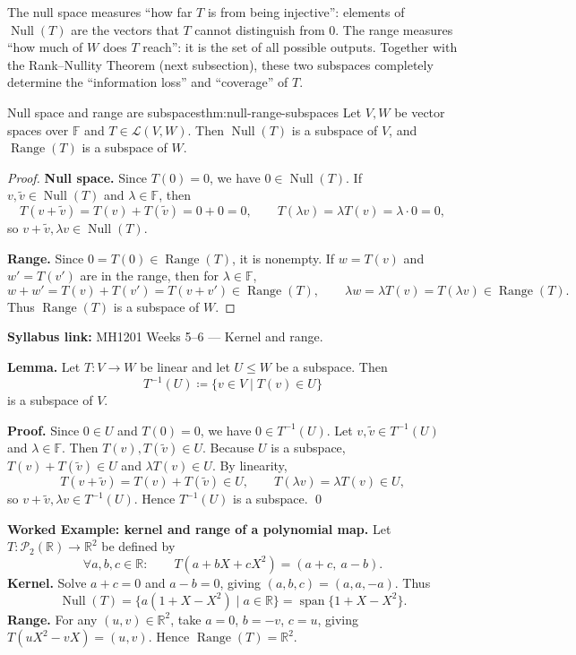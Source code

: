 The null space measures ``how far $T$ is from being injective'': elements of $\operatorname{Null}(T)$ are the vectors that $T$ cannot distinguish from $0$.
The range measures ``how much of $W$ does $T$ reach'': it is the set of all possible outputs.
Together with the Rank--Nullity Theorem (next subsection), these two subspaces completely determine the ``information loss'' and ``coverage'' of $T$.

\begin{theorem}{Null space and range are subspaces}{thm:null-range-subspaces}
Let $V,W$ be vector spaces over $\mathbb{F}$ and $T\in\mathcal{L}(V,W)$.
Then $\operatorname{Null}(T)$ is a subspace of $V$, and $\operatorname{Range}(T)$ is a subspace of $W$.
\end{theorem}

\begin{proof}
\textbf{Null space.} Since $T(0)=0$, we have $0\in\operatorname{Null}(T)$.
If $v,\tilde v\in\operatorname{Null}(T)$ and $\lambda\in\mathbb{F}$, then
\[
T(v+\tilde v)=T(v)+T(\tilde v)=0+0=0,\qquad T(\lambda v)=\lambda T(v)=\lambda\cdot 0=0,
\]
so $v+\tilde v,\lambda v\in\operatorname{Null}(T)$.

\textbf{Range.} Since $0=T(0)\in\operatorname{Range}(T)$, it is nonempty.
If $w=T(v)$ and $w'=T(v')$ are in the range, then for $\lambda\in\mathbb{F}$,
\[
w+w'=T(v)+T(v')=T(v+v')\in\operatorname{Range}(T),\qquad
\lambda w=\lambda T(v)=T(\lambda v)\in\operatorname{Range}(T).
\]
Thus $\operatorname{Range}(T)$ is a subspace of $W$.
\end{proof}

\begin{extension}[title={Extension (Beyond Syllabus: Preimages preserve subspaces)}]
\textbf{Syllabus link:} MH1201 Weeks 5--6 — Kernel and range.

\textbf{Lemma.} Let $T:V\to W$ be linear and let $U\le W$ be a subspace. Then
\[
T^{-1}(U)\coloneqq \{v\in V \mid T(v)\in U\}
\]
is a subspace of $V$.

\textbf{Proof.} Since $0\in U$ and $T(0)=0$, we have $0\in T^{-1}(U)$.
Let $v,\tilde v\in T^{-1}(U)$ and $\lambda\in\mathbb{F}$. Then $T(v),T(\tilde v)\in U$.
Because $U$ is a subspace, $T(v)+T(\tilde v)\in U$ and $\lambda T(v)\in U$.
By linearity,
\[
T(v+\tilde v)=T(v)+T(\tilde v)\in U,\qquad T(\lambda v)=\lambda T(v)\in U,
\]
so $v+\tilde v,\lambda v\in T^{-1}(U)$. Hence $T^{-1}(U)$ is a subspace. \qed
\end{extension}

\begin{examplebox}
\textbf{Worked Example: kernel and range of a polynomial map.}
Let $T:\mathcal{P}_2(\mathbb{R})\to\mathbb{R}^2$ be defined by
\[
\forall a,b,c\in\mathbb{R}:\qquad T(a+bX+cX^2)=(a+c,\ a-b).
\]
\textbf{Kernel.} Solve $a+c=0$ and $a-b=0$, giving $(a,b,c)=(a,a,-a)$.
Thus
\[
\operatorname{Null}(T)=\{a(1+X-X^2)\mid a\in\mathbb{R}\}=\operatorname{span}\{1+X-X^2\}.
\]
\textbf{Range.} For any $(u,v)\in\mathbb{R}^2$, take $a=0$, $b=-v$, $c=u$, giving $T(uX^2-vX)=(u,v)$.
Hence $\operatorname{Range}(T)=\mathbb{R}^2$.
\end{examplebox}

